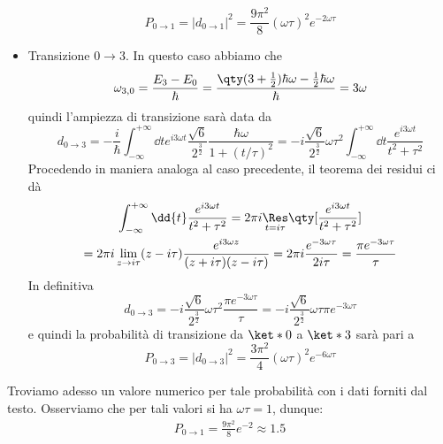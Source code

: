 \begin{soluzione}
\begin{itemize}[leftmargin=0.5cm]
   \begin{equation*}
      P_{0 \to 1}
      =| d_{0 \to 1} |^2
      =\frac{9 \pi^2}{8} (\omega \tau)^2 e^{-2\omega \tau}
   \end{equation*}
   \item Transizione $0 \to 3$. In questo caso abbiamo che
   \begin{equation*}
      \omega_{3,0}
      =\frac{E_3 - E_0}{\hbar}
      =\frac{\qty( 3 + \frac{1}{2} ) \hbar\omega - \frac{1}{2} \hbar\omega }{\hbar}
      =3\omega
   \end{equation*}
   quindi l'ampiezza di transizione sarà data da
   \begin{equation*}
      d_{0 \to 3}
      =-\frac{i}{\hbar} \int_{-\infty}^{+\infty} \dd{t} e^{i 3\omega t} \frac{\sqrt{6}}{2^{\frac{3}{2}}} \frac{\hbar\omega}{1 + (t/\tau)^2}
      =-i \frac{\sqrt{6}}{2^{\frac{3}{2}}} \omega \tau^2 \int_{-\infty}^{+\infty} \dd{t} \frac{e^{i 3\omega t}}{t^2 + \tau^2}
   \end{equation*}
   Procedendo in maniera analoga al caso precedente, il teorema dei residui ci dà
   \begin{gather*}
      \int_{-\infty}^{+\infty} \dd{t} \frac{e^{i 3\omega t}}{t^2 + \tau^2}
      =2\pi i \underset{t=i\tau}{\Res} \qty[ \frac{e^{i 3\omega t}}{t^2 + \tau^2} ]
      \\
      =2\pi i \lim_{z \to i\tau} (z - i\tau) \frac{e^{i 3\omega z}}{(z + i\tau)(z - i\tau)}
      =2\pi i \frac{e^{-3\omega \tau}}{2i\tau}
      =\frac{\pi e^{-3\omega \tau}}{\tau}
   \end{gather*}
   In definitiva
   \begin{equation*}
      d_{0 \to 3}
      =-i \frac{\sqrt{6}}{2^{\frac{3}{2}}} \omega \tau^2 \frac{\pi e^{-3\omega \tau}}{\tau}
      =-i\frac{\sqrt{6}}{2^{\frac{3}{2}}} \omega \tau \pi e^{-3\omega \tau}
   \end{equation*}
   e quindi la probabilità di transizione da $\ket*{0}$ a $\ket*{3}$ sarà pari a
   \begin{equation*}
      P_{0 \to 3}
      =| d_{0 \to 3} |^2
      =\frac{3 \pi^2}{4} (\omega \tau)^2 e^{-6\omega \tau}
   \end{equation*}
\end{itemize}
   Troviamo adesso un valore numerico per tale probabilità con i dati forniti dal testo. Osserviamo che per tali valori si ha $\omega \tau=1$, dunque:
   \begin{gather*}
      P_{0 \to 1}
      =\frac{9 \pi^2}{8} e^{-2}
      \approx 1.5
      \\

\end{gather*}
\end{soluzione}
